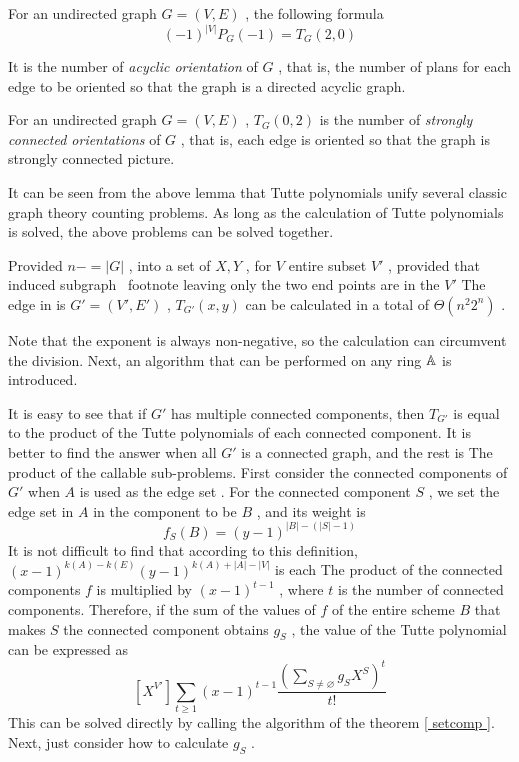 \begin { lemma }
For an undirected graph $ G = (V, E) $ , the following formula
$$ (- 1 )^{|V|}P_G(- 1 )=T_G( 2 , 0 ) $$

It is the number of \emph { acyclic orientation } of $ G $ , that is, the number of plans for each edge to be oriented so that the graph is a directed acyclic graph.
\end { lemma }

\begin { lemma }
For an undirected graph $ G = (V, E) $ , $ T_G( 0 , 2 ) $ is the number of \emph { strongly connected orientations } of $ G $ , that is, each edge is oriented so that the graph is strongly connected picture.
\end { lemma }

It can be seen from the above lemma that Tutte polynomials unify several classic graph theory counting problems. As long as the calculation of Tutte polynomials is solved, the above problems can be solved together.

\begin { theorem }
Provided $ n-= | G | $ , into a set of $ X, Y $ , for $ V $ entire subset $ V ' $ , provided that induced subgraph \ footnote {leaving only the two end points are in the $ V' $ The edge in} is $ G'=(V',E') $ , $ T_{G'}(x,y) $ can be calculated in a total of $ \Theta (n^ 2  2 ^n) $ .
\end { theorem }

Note that the exponent is always non-negative, so the calculation can circumvent the division. Next, an algorithm that can be performed on any ring $  \mathbb A $ is introduced.

It is easy to see that if $ G' $ has multiple connected components, then $ T_{G'} $ is equal to the product of the Tutte polynomials of each connected component. It is better to find the answer when all $ G' $ is a connected graph, and the rest is The product of the callable sub-problems. First consider the connected components of $ G' $ when $ A $ is used as the edge set . For the connected component $ S $ , we set the edge set in $ A $ in the component to be $ B $ , and its weight is
$$
f_S(B)=(y- 1 )^{|B|-(|S|-1)}
$$
It is not difficult to find that according to this definition, $ (x- 1 )^{k(A)-k(E)}(y- 1 )^{k(A)+|A|-|V|} $ is each The product of the connected components $ f $ is multiplied by $ (x- 1 )^{t-1} $ , where $ t $ is the number of connected components. Therefore, if the sum of the values of $ f $ of the entire scheme $ B $ that makes $ S $ the connected component obtains $ g_S $ , the value of the Tutte polynomial can be expressed as
$$
[X^{V'}] \sum _{t \ge 1} (x- 1 )^{t-1} \frac { \left ( \sum _{S \neq  \varnothing } g_S X^S \right )^t}{t!}
$$
This can be solved directly by calling the algorithm of the theorem \ref { setcomp }. Next, just consider how to calculate $ g_S $ .

